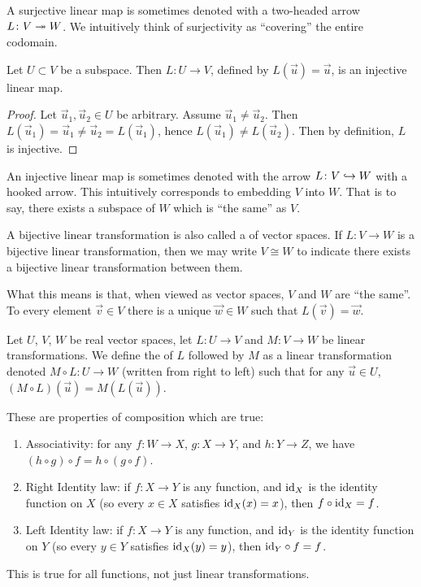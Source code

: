 A surjective linear map is sometimes denoted with a two-headed arrow
$L\colon V\twoheadrightarrow W$. We intuitively think of surjectivity as ``covering''
the entire codomain.

\begin{example}
Let $U\subset V$ be a subspace. Then $L\colon U\to V$, defined by $L(\vec{u})=\vec{u}$,
is an injective linear map.

\begin{proof}
Let $\vec{u}_{1},\vec{u}_{2}\in U$ be arbitrary. Assume $\vec{u}_{1}\neq\vec{u}_{2}$.
Then $L(\vec{u}_{1})=\vec{u}_{1}\neq\vec{u}_{2}=L(\vec{u}_{1})$, hence
$L(\vec{u}_{1})\neq L(\vec{u}_{2})$. Then by definition, $L$ is injective.
\end{proof}
\end{example}

An injective linear map is sometimes denoted with the arrow $L\colon V\hookrightarrow W$
with a hooked arrow. This intuitively corresponds to embedding $V$ into $W$.
That is to say, there exists a subspace of $W$ which is ``the same'' as
$V$.

A bijective linear transformation is also called a 
of vector spaces. If $L\colon V\to W$ is a bijective linear
transformation, then we may write $V\cong W$ to indicate there exists a
bijective linear transformation between them.

What this means is that, when viewed as vector spaces, $V$ and $W$ are
``the same''. To every element $\vec{v}\in V$ there is a unique
$\vec{w}\in W$ such that $L(\vec{v})=\vec{w}$.

\begin{definition}
Let $U$, $V$, $W$ be real vector spaces, let $L\colon U\to V$ and
$M\colon V\to W$ be linear transformations. We define the
 of $L$ followed by $M$ as a linear transformation
denoted $M\circ L\colon U\to W$ (written from right to left) such that
for any $\vec{u}\in U$, $(M\circ L)(\vec{u}) = M\left(L(\vec{u})\right)$.
\end{definition}

These are properties of composition which are true:
\begin{enumerate}
\item Associativity: for any $f\colon W\to X$, $g\colon X\to Y$, and
  $h\colon Y\to Z$, we have $(h\circ g)\circ f = h\circ(g\circ f)$.
\item Right Identity law: if $f\colon X\to Y$ is any function, and $\mathrm{id}_{X}$ is
  the identity function on $X$ (so every $x\in X$ satisfies $\mathrm{id}_{X}(x)=x$),
  then $f\circ\mathrm{id}_{X}=f$.
\item Left Identity law: if $f\colon X\to Y$ is any function, and $\mathrm{id}_{Y}$ is
  the identity function on $Y$ (so every $y\in Y$ satisfies $\mathrm{id}_{X}(y)=y$),
  then $\mathrm{id}_{Y}\circ f=f$.
\end{enumerate}
This is true for all functions, not just linear transformations.

